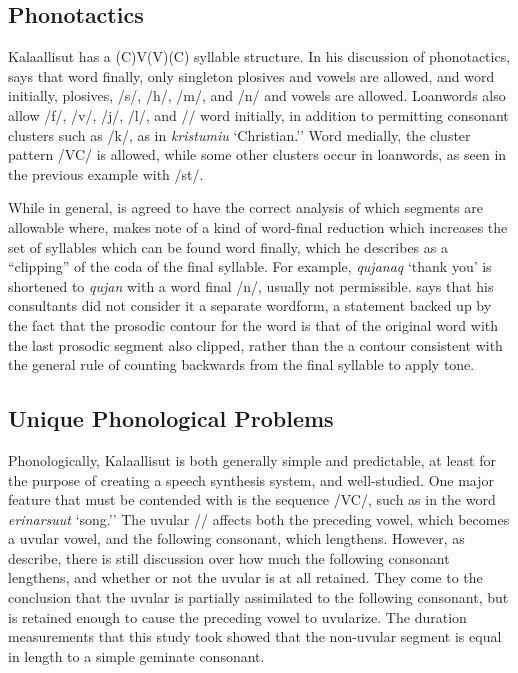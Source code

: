 \documentclass[12pt]{article}
\begin{document}
	\subsection{Phonotactics}

	Kalaallisut has a (C)V(V)(C) syllable structure. In his discussion of phonotactics, \citet{grammar} says that word finally, only singleton plosives and vowels are allowed, and word initially, plosives, /s/, /h/, /m/, and /n/ and vowels are allowed. Loanwords also allow /f/, /v/, /j/, /l/, and /\textinvscr/ word initially, in addition to permitting consonant clusters such as /k\textinvscr/, as in \textit{kristumiu} `Christian.'' Word medially, the cluster pattern /V\textinvscr C/ is allowed, while some other clusters occur in loanwords, as seen in the previous example with /st/. \par

	While in general, \citet{grammar} is agreed to have the correct analysis of which segments are allowable where, \citet{rischel} makes note of a kind of word-final reduction which increases the set of syllables which can be found word finally, which he describes as a ``clipping'' of the coda of the final syllable. For example, \textit{qujanaq} `thank you' is shortened to \textit{qujan} with a word final /n/, usually not permissible. \citet{rischel} says that his consultants did not consider it a separate wordform, a statement backed up by the fact that the prosodic contour for the word is that of the original word with the last prosodic segment also clipped, rather than the a contour consistent with the general rule of counting backwards from the final syllable to apply tone. \par 

	\subsection{Unique Phonological Problems}

	Phonologically, Kalaallisut is both generally simple and predictable, at least for the purpose of creating a speech synthesis system, and well-studied. One major feature that must be contended with is the sequence /V\textinvscr C/, such as in the word \textit{erinarsuut} `song.'' The uvular /\textinvscr/ affects both the preceding vowel, which becomes a uvular vowel, and the following consonant, which lengthens. However, as \citet{quan} describe, there is still discussion over how much the following consonant lengthens, and whether or not the uvular is at all retained. They come to the conclusion that the uvular is partially assimilated to the following consonant, but is retained enough to cause the preceding vowel to uvularize. The duration measurements that this study took showed that the non-uvular segment is equal in length to a simple geminate consonant. \par
\end{document}
